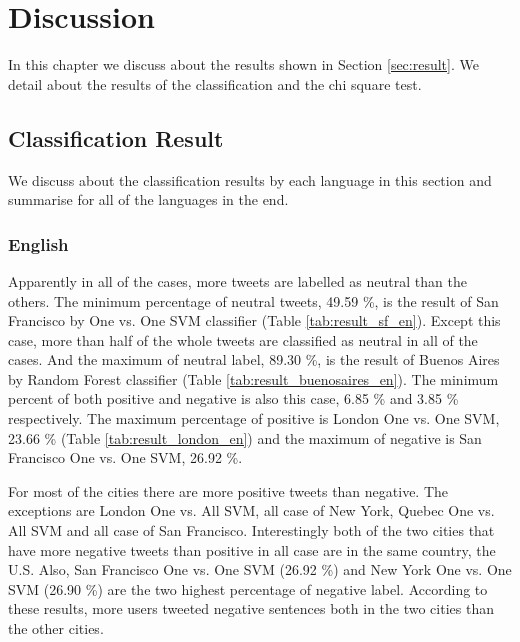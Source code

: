\chapter{Discussion}
In this chapter we discuss about the results shown in Section \ref{sec:result}.
We detail about the results of the classification and the chi square test.

\section{Classification Result}\label{sec:clf_result}
We discuss about the classification results by each language in this section and summarise for all of the languages in the end.
\subsection{English}
Apparently in all of the cases, more tweets are labelled as neutral than the others.
The minimum percentage of neutral tweets, 49.59 \%, is the result of San Francisco by One vs. One SVM classifier (Table \ref{tab:result_sf_en}).
Except this case, more than half of the whole tweets are classified as neutral in all of the cases.
And the maximum of neutral label, 89.30 \%, is the result of Buenos Aires by Random Forest classifier (Table \ref{tab:result_buenosaires_en}).
The minimum percent of both positive and negative is also this case, 6.85 \% and 3.85 \% respectively.
The maximum percentage of positive is London One vs. One SVM, 23.66 \% (Table \ref{tab:result_london_en}) and the maximum of negative is San Francisco One vs. One SVM, 26.92 \%.


For most of the cities there are more positive tweets than negative.
The exceptions are London One vs. All SVM, all case of New York, Quebec One vs. All SVM and all case of San Francisco.
Interestingly both of the two cities that have more negative tweets than positive in all case are in the same country, the U.S.
Also, San Francisco One vs. One SVM (26.92 \%) and New York One vs. One SVM (26.90 \%) are the two highest percentage of negative label.
According to these results, more users tweeted negative sentences both in the two cities than the other cities.
